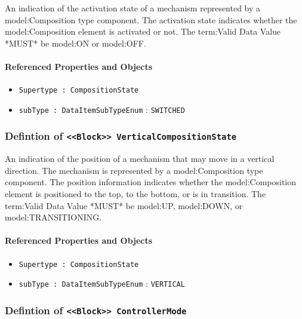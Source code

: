\FloatBarrier

An indication of the activation state of a mechanism represented by a {model:Composition} type component.
 The activation state indicates whether the {model:Composition} element is activated or not.
 The {term:Valid Data Value} *MUST* be {model:ON} or {model:OFF}.

\FloatBarrier
\paragraph{Referenced Properties and Objects}

\begin{itemize}
\item \texttt{Supertype : CompositionState}

\item \texttt{subType : DataItemSubTypeEnum} : \texttt{SWITCHED}

\end{itemize}
\FloatBarrier
\subsubsection{Defintion of \texttt{<<Block>> VerticalCompositionState}}
  \label{type:VerticalCompositionState}

\FloatBarrier

An indication of the position of a mechanism that may move in a vertical direction. The mechanism is represented by a {model:Composition} type component. 
 The position information indicates whether the {model:Composition} element is positioned to the top, to the bottom, or is in transition.  
 The {term:Valid Data Value} *MUST* be {model:UP}, {model:DOWN}, or {model:TRANSITIONING}.

\FloatBarrier
\paragraph{Referenced Properties and Objects}

\begin{itemize}
\item \texttt{Supertype : CompositionState}

\item \texttt{subType : DataItemSubTypeEnum} : \texttt{VERTICAL}

\end{itemize}
\FloatBarrier
\subsubsection{Defintion of \texttt{<<Block>> ControllerMode}}
  \label{type:ControllerMode}

